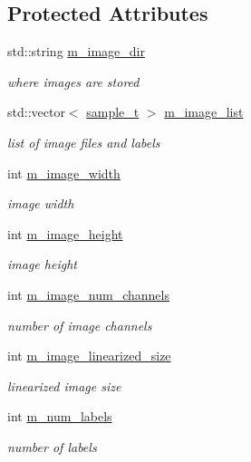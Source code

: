 \subsection*{Protected Attributes}
\begin{DoxyCompactItemize}
\item 
std\+::string \hyperlink{classlbann_1_1image__data__reader_ab1289f0207f3a9989c7b28e09a23c9a3}{m\+\_\+image\+\_\+dir}
\begin{DoxyCompactList}\small\item\em where images are stored \end{DoxyCompactList}\item 
std\+::vector$<$ \hyperlink{classlbann_1_1image__data__reader_a7580011ef6ef9da32e1a3bc49ad0706c}{sample\+\_\+t} $>$ \hyperlink{classlbann_1_1image__data__reader_ae3fc949bd08c45ceafb1a03503261008}{m\+\_\+image\+\_\+list}
\begin{DoxyCompactList}\small\item\em list of image files and labels \end{DoxyCompactList}\item 
int \hyperlink{classlbann_1_1image__data__reader_af001f3d1c0f1c580b66988233b3a64f0}{m\+\_\+image\+\_\+width}
\begin{DoxyCompactList}\small\item\em image width \end{DoxyCompactList}\item 
int \hyperlink{classlbann_1_1image__data__reader_a0632efa3deaa9d61e671f741909eb3fe}{m\+\_\+image\+\_\+height}
\begin{DoxyCompactList}\small\item\em image height \end{DoxyCompactList}\item 
int \hyperlink{classlbann_1_1image__data__reader_aab1a440f361521dc7bd583cefe1061f8}{m\+\_\+image\+\_\+num\+\_\+channels}
\begin{DoxyCompactList}\small\item\em number of image channels \end{DoxyCompactList}\item 
int \hyperlink{classlbann_1_1image__data__reader_af512f1f866c0f654309b7f28886dca9a}{m\+\_\+image\+\_\+linearized\+\_\+size}
\begin{DoxyCompactList}\small\item\em linearized image size \end{DoxyCompactList}\item 
int \hyperlink{classlbann_1_1image__data__reader_af280e8758a6ec3acee7c62e6351d17e0}{m\+\_\+num\+\_\+labels}
\begin{DoxyCompactList}\small\item\em number of labels \end{DoxyCompactList}\end{DoxyCompactItemize}


